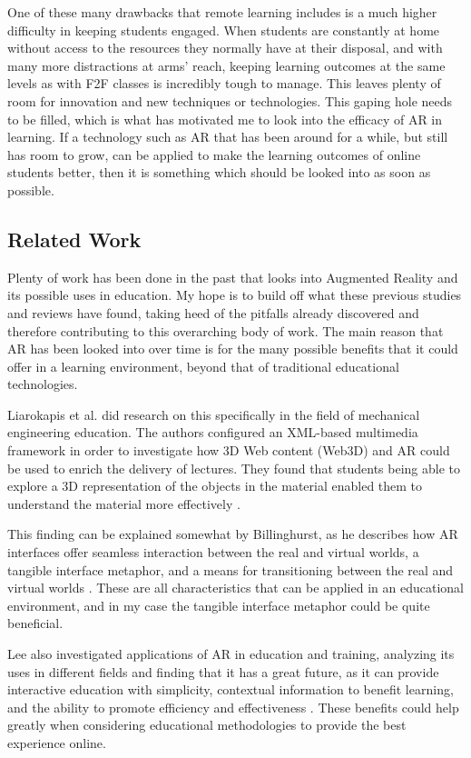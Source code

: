\documentclass[sigconf]{acmart}
\begin{document}
One of these many drawbacks that remote learning includes is a much higher difficulty in keeping students engaged. When students are constantly at home without access to the resources they normally have at their disposal, and with many more distractions at arms' reach, keeping learning outcomes at the same levels as with F2F classes is incredibly tough to manage. This leaves plenty of room for innovation and new techniques or technologies. This gaping hole needs to be filled, which is what has motivated me to look into the efficacy of AR in learning. If a technology such as AR that has been around for a while, but still has room to grow, can be applied to make the learning outcomes of online students better, then it is something which should be looked into as soon as possible.

\subsection{Related Work}
Plenty of work has been done in the past that looks into Augmented Reality and its possible uses in education. My hope is to build off what these previous studies and reviews have found, taking heed of the pitfalls already discovered and therefore contributing to this overarching body of work. The main reason that AR has been looked into over time is for the many possible benefits that it could offer in a learning environment, beyond that of traditional educational technologies.

Liarokapis et al. did research on this specifically in the field of mechanical engineering education. The authors configured an XML-based multimedia framework in order to investigate how 3D Web content (Web3D) and AR could be used to enrich the delivery of lectures. They found that students being able to explore a 3D representation of the objects in the material enabled them to understand the material more effectively \cite{liarokapis04}.

This finding can be explained somewhat by Billinghurst, as he describes how AR interfaces offer seamless interaction between the real and virtual worlds, a tangible interface metaphor, and a means for transitioning between the real and virtual worlds \cite{billinghurst02}. These are all characteristics that can be applied in an educational environment, and in my case the tangible interface metaphor could be quite beneficial.

Lee also investigated applications of AR in education and training, analyzing its uses in different fields and finding that it has a great future, as it can provide interactive education with simplicity, contextual information to benefit learning, and the ability to promote efficiency and effectiveness \cite{lee12}. These benefits could help greatly when considering educational methodologies to provide the best experience online.
\end{document}
